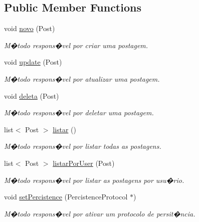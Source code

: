 \subsection*{Public Member Functions}
\begin{DoxyCompactItemize}
\item 
void \hyperlink{class_l_n_post_a3ab3b83674e572c7a8c645c8ea6f447d}{novo} (Post)
\begin{DoxyCompactList}\small\item\em M�todo respons�vel por criar uma postagem. \end{DoxyCompactList}\item 
void \hyperlink{class_l_n_post_a76e4575cc5e542510c1f135f879e88f5}{update} (Post)
\begin{DoxyCompactList}\small\item\em M�todo respons�vel por atualizar uma postagem. \end{DoxyCompactList}\item 
void \hyperlink{class_l_n_post_a24a5694180c400a4f75b05e3cc2b1b49}{deleta} (Post)
\begin{DoxyCompactList}\small\item\em M�todo respons�vel por deletar uma postagem. \end{DoxyCompactList}\item 
list$<$ Post $>$ \hyperlink{class_l_n_post_a582c8842eedeab81555081eb83af8802}{listar} ()
\begin{DoxyCompactList}\small\item\em M�todo respons�vel por listar todas as postagens. \end{DoxyCompactList}\item 
list$<$ Post $>$ \hyperlink{class_l_n_post_ad57f97108f666b1c2cc512e8301bc659}{listar\-Por\-User} (Post)
\begin{DoxyCompactList}\small\item\em M�todo respons�vel por listar as postagens por usu�rio. \end{DoxyCompactList}\item 
void \hyperlink{class_l_n_post_a0f45810ec3c120b544810d9408d013e9}{set\-Percistence} (Percistence\-Protocol $\ast$)
\begin{DoxyCompactList}\small\item\em M�todo respons�vel por ativar um protocolo de persit�ncia. \end{DoxyCompactList}\end{DoxyCompactItemize}


